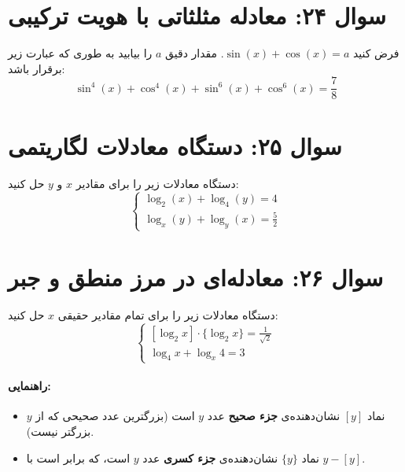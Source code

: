 \documentclass[12pt]{article}
\begin{document}
	\vspace{1cm}
	\hrulefill
	\vspace{1cm}
	\section*{سوال ۲۴: معادله مثلثاتی با هویت ترکیبی}
	فرض کنید \( \sin(x) + \cos(x) = a \). مقدار دقیق \( a \) را بیابید به طوری که عبارت زیر برقرار باشد:
	\[
	\sin^4(x) + \cos^4(x) + \sin^6(x) + \cos^6(x) = \frac{7}{8}
	\]
	\vspace{1cm}
	\hrulefill
	\vspace{1cm}
	\section*{سوال ۲۵: دستگاه معادلات لگاریتمی}
	دستگاه معادلات زیر را برای مقادیر \(x\) و \(y\) حل کنید:
	\begin{displaymath}
		\begin{cases}
			\log_{2}(x) + \log_{4}(y) = 4 \\
			\log_{x}(y) + \log_{y}(x) = \frac{5}{2}
		\end{cases}
	\end{displaymath}
	
	\vspace{1cm}
	\hrulefill
	\vspace{1cm}
	
	\section*{سوال ۲۶: معادله‌ای در مرز منطق و جبر}
	دستگاه معادلات زیر را برای تمام مقادیر حقیقی \(x\) حل کنید:
	\begin{displaymath}
		\begin{cases}
			[\log_{2}x] \cdot \{\log_{2}x\} = \frac{1}{\sqrt{2}} \\
			\log_{4}x + \log_{x}4 = 3
		\end{cases}
	\end{displaymath}
	\paragraph{راهنمایی:}
	\begin{itemize}[rightmargin=2cm]
		\item نماد \( [y] \) نشان‌دهنده‌ی \textbf{جزء صحیح} عدد \(y\) است (بزرگترین عدد صحیحی که از \(y\) بزرگتر نیست).
		\item نماد \( \{y\} \) نشان‌دهنده‌ی \textbf{جزء کسری} عدد \(y\) است، که برابر است با \(y - [y]\).
	\end{itemize}
	
\end{document}

